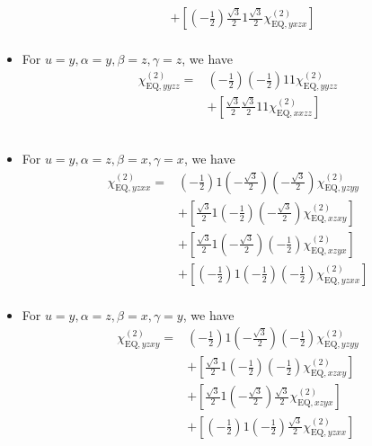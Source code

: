 \documentclass[UTF8,10pt,a4paper]{article}
\begin{document}
\begin{itemize}
\begin{align}
\nonumber&+\left[\left(-\frac{1}{2}\right)\frac{\sqrt{3}}{2}1\frac{\sqrt{3}}{2}\chi_{\text{EQ},yxzx}^{(2)}\right]\\
&
\end{align}\normalsize
\item For $u=y,\alpha=y,\beta=z,\gamma=z$, we have
\footnotesize\begin{align}
\nonumber\chi_{\text{EQ},yyzz}^{(2)}=&\left(-\frac{1}{2}\right)\left(-\frac{1}{2}\right)11\chi_{\text{EQ},yyzz}^{(2)}\\
\nonumber&+\left[\frac{\sqrt{3}}{2}\frac{\sqrt{3}}{2}11\chi_{\text{EQ},xxzz}^{(2)}\right]\\
\nonumber&\\
\nonumber&\\
&
\end{align}\normalsize
\item For $u=y,\alpha=z,\beta=x,\gamma=x$, we have
\footnotesize\begin{align}
\nonumber\chi_{\text{EQ},yzxx}^{(2)}=&\left(-\frac{1}{2}\right)1\left(-\frac{\sqrt{3}}{2}\right)\left(-\frac{\sqrt{3}}{2}\right)\chi_{\text{EQ},yzyy}^{(2)}\\
\nonumber&+\left[\frac{\sqrt{3}}{2}1\left(-\frac{1}{2}\right)\left(-\frac{\sqrt{3}}{2}\right)\chi_{\text{EQ},xzxy}^{(2)}\right]\\
\nonumber&+\left[\frac{\sqrt{3}}{2}1\left(-\frac{\sqrt{3}}{2}\right)\left(-\frac{1}{2}\right)\chi_{\text{EQ},xzyx}^{(2)}\right]\\
\nonumber&+\left[\left(-\frac{1}{2}\right)1\left(-\frac{1}{2}\right)\left(-\frac{1}{2}\right)\chi_{\text{EQ},yzxx}^{(2)}\right]\\
&
\end{align}\normalsize
\item For $u=y,\alpha=z,\beta=x,\gamma=y$, we have
\footnotesize\begin{align}
\nonumber\chi_{\text{EQ},yzxy}^{(2)}=&\left(-\frac{1}{2}\right)1\left(-\frac{\sqrt{3}}{2}\right)\left(-\frac{1}{2}\right)\chi_{\text{EQ},yzyy}^{(2)}\\
\nonumber&+\left[\frac{\sqrt{3}}{2}1\left(-\frac{1}{2}\right)\left(-\frac{1}{2}\right)\chi_{\text{EQ},xzxy}^{(2)}\right]\\
\nonumber&+\left[\frac{\sqrt{3}}{2}1\left(-\frac{\sqrt{3}}{2}\right)\frac{\sqrt{3}}{2}\chi_{\text{EQ},xzyx}^{(2)}\right]\\
\nonumber&+\left[\left(-\frac{1}{2}\right)1\left(-\frac{1}{2}\right)\frac{\sqrt{3}}{2}\chi_{\text{EQ},yzxx}^{(2)}\right]\\

\end{align}
\end{itemize}
\end{document}
